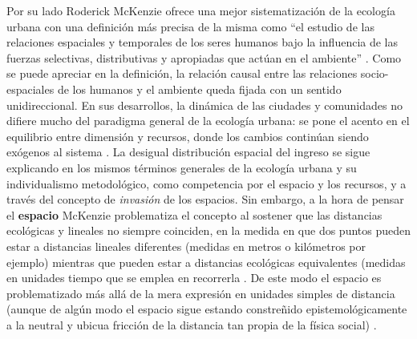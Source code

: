 Por su lado Roderick McKenzie \citeyear{mckenzie} ofrece una mejor sistematización de la ecología urbana con una definición más precisa de la misma como “el estudio de las relaciones espaciales y temporales de los seres humanos bajo la influencia de las fuerzas selectivas, distributivas y apropiadas que actúan en el ambiente” \cite[p.~91]{betin}. Como se puede apreciar en la definición, la relación causal entre las relaciones socio-espaciales de los humanos y el ambiente queda fijada con un sentido unidireccional. En sus desarrollos, la dinámica de las ciudades y comunidades no difiere mucho del paradigma general de la ecología urbana: se pone el acento en el equilibrio entre dimensión y recursos, donde los cambios continúan siendo exógenos al sistema \cite{gottdiener}. La desigual distribución espacial del ingreso se sigue explicando en los mismos términos generales de la ecología urbana y su individualismo metodológico, como competencia por el espacio y los recursos, y a través del concepto de \textit{invasión} de los espacios. Sin embargo, a la hora de pensar el \textbf{espacio} McKenzie  problematiza el concepto al sostener que las distancias ecológicas y lineales no siempre coinciden, en la medida en que dos puntos pueden estar a distancias lineales diferentes (medidas en metros o kilómetros por ejemplo) mientras que pueden estar a distancias ecológicas equivalentes (medidas en unidades tiempo que se emplea en recorrerla \cite{betin,mckenzie}. De este modo el espacio es problematizado más allá de la mera expresión en unidades simples de distancia (aunque de algún modo el espacio sigue estando constreñido epistemológicamente a la neutral y ubicua fricción de la distancia tan propia de la física social) \cite{soja}.


